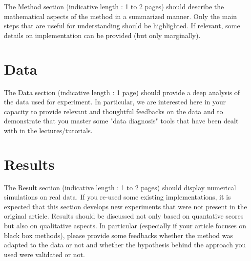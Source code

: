 \documentclass[11pt]{article}
\begin{document}
The Method section (indicative length : 1 to 2 pages) should describe the mathematical aspects of the method in a summarized manner. Only the main steps that are useful for understanding should be highlighted. If relevant, some details on implementation can be provided (but only marginally).

\section{Data}
The Data section (indicative length : 1 page) should provide a deep analysis of the data used for experiment. In particular, we are interested here in your capacity to provide relevant and thoughtful feedbacks on the data and to demonstrate that you master some "data diagnosis" tools that have been dealt with in the lectures/tutorials.

\section{Results}
The Result section (indicative length : 1 to 2 pages) should display numerical simulations on real data. If you re-used some existing implementations, it is expected that this section develops new experiments that were not present in the original article. Results should be discussed not only based on quantative scores but also on qualitative aspects. In particular (especially if your article focuses on black box methods), please provide some feedbacks whether the method was adapted to the data or not and whether the hypothesis behind the approach you used were validated or not.
\end{document}
